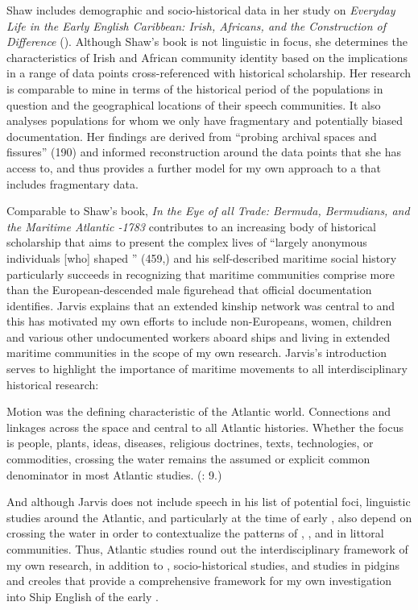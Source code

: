 Shaw includes demographic and socio-historical data in her study on \textit{Everyday Life in the Early English Caribbean: Irish, Africans, and the Construction of Difference} (\citeyear*{Shaw2013}). Although Shaw’s book is not linguistic in focus, she determines the characteristics of Irish and African community identity based on the implications in a range of data points cross-referenced with historical scholarship. Her research is comparable to mine in terms of the historical period of the populations in question and the geographical locations of their speech communities. It also analyses populations for whom we only have fragmentary and potentially biased documentation. Her findings are derived from “probing archival spaces and fissures” (190) and informed reconstruction around the data points that she has access to, and thus provides a further model for my own approach to a  that includes fragmentary data. 

Comparable to Shaw’s book,  \textit{In the Eye of all Trade: Bermuda, Bermudians, and the Maritime Atlantic \citealt{World1680}-1783} contributes to an increasing body of historical scholarship that aims to present the complex lives of “largely anonymous individuals [who] shaped ” (459,) and his self-described maritime social history particularly succeeds in recognizing that maritime communities comprise more than the European-descended male figurehead that official documentation identifies. Jarvis explains that an extended kinship network was central to  and this has motivated my own efforts to include non-Europeans, women, children and various other undocumented workers aboard ships and living in extended maritime communities in the scope of my own research. Jarvis’s introduction serves to highlight the importance of maritime movements to all interdisciplinary historical research: 

Motion was the defining characteristic of the Atlantic world. Connections and linkages across the space and central to all Atlantic histories. Whether the focus is people, plants, ideas, diseases, religious doctrines, texts, technologies, or commodities, crossing the water remains the assumed or explicit common denominator in most Atlantic studies. (\citealt{Jarvis2010}: 9.)

And although Jarvis does not include speech in his list of potential foci, linguistic studies around the Atlantic, and particularly at the time of early , also depend on crossing the water in order to contextualize the patterns of ,  , and  in littoral communities. Thus, Atlantic studies round out the interdisciplinary framework of my own research, in addition to , socio-historical studies, and studies in pidgins and creoles that provide a comprehensive framework for my own investigation into Ship English of the early . 

